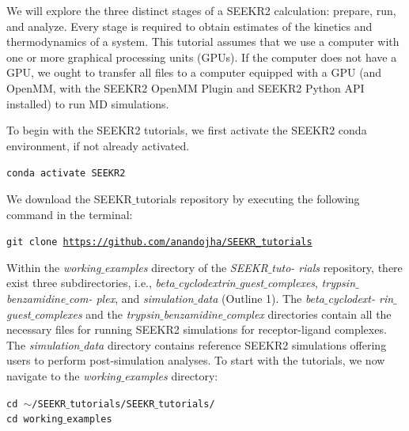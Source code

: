 \documentclass[9pt,training,pubversion]{livecoms}
\newcommand{\seekrtutorialsgithublink}{\url{https://github.com/anandojha/SEEKR_tutorials}}
\begin{document}
\noindent We will explore the three distinct stages of a SEEKR2 calculation: prepare, run, and analyze. Every stage is required to obtain estimates of the kinetics and thermodynamics of a system. This tutorial assumes that we use a computer with one or more graphical processing units (GPUs). If the computer does not have a GPU, we ought to transfer all files to a computer equipped with a GPU (and OpenMM, with the SEEKR2 OpenMM Plugin and SEEKR2 Python API installed) to run MD simulations. \par

\noindent To begin with the SEEKR2 tutorials, we first activate the SEEKR2 conda environment, if not already activated. 

\begin{tcolorbox}[colback=black!8!white, colframe=black!50!black, fontlower=\tiny, left=2pt, right=2pt, top=2pt, bottom=2pt] 
\texttt{conda activate SEEKR2}
\end{tcolorbox}
\noindent We download the SEEKR$\_$tutorials repository by executing the following command in the terminal:

\begin{tcolorbox}[colback=black!8!white, colframe=black!50!black, fontlower=\tiny, left=2pt, right=2pt, top=2pt, bottom=2pt] 
\texttt{git clone \seekrtutorialsgithublink}
\end{tcolorbox}

\noindent Within the \textit{working$\_$examples} directory of the \textit{SEEKR$\_$tuto- \linebreak rials} repository, there exist three subdirectories, i.e., \textit{beta$\_$cyclodextrin$\_$guest$\_$complexes}, \textit{trypsin$\_$benzamidine$\_$com- \linebreak plex}, and \textit{simulation$\_$data} (Outline 1). The \textit{beta$\_$cyclodext- \linebreak rin$\_$guest$\_$complexes} and the \textit{trypsin$\_$benzamidine$\_$complex} directories contain all the necessary files for running SEEKR2 simulations for receptor-ligand complexes. The \textit{simulation$\_$data} directory contains reference SEEKR2 simulations offering users to perform post-simulation analyses. To start with the tutorials, we now navigate to the \textit{working$\_$examples} directory:

\begin{tcolorbox}[colback=black!8!white, colframe=black!50!black, fontlower=\tiny, left=2pt, right=2pt, top=2pt, bottom=2pt] 
\texttt{cd $\sim$/SEEKR$\_$tutorials/SEEKR$\_$tutorials/} \\
\texttt{cd working$\_$examples}
\end{tcolorbox}
\end{document}
